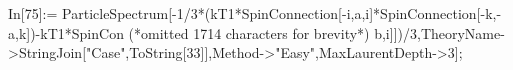In[75]:= ParticleSpectrum[-1/3*(kT1*SpinConnection[-i,a,i]*SpinConnection[-k,-a,k])-kT1*SpinCon (*omitted 1714 characters for brevity*) b,i]])/3,TheoryName->StringJoin["Case",ToString[33]],Method->"Easy",MaxLaurentDepth->3];